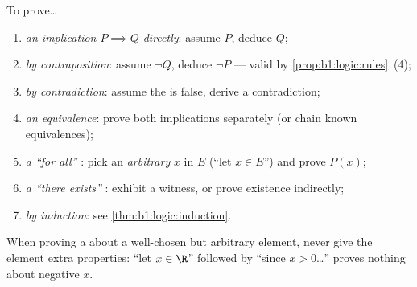 \begin{method}\label{met:b1:logic:proofs}
To prove\dots
\begin{enumerate}
  \item \emph{an implication $P \implies Q$ directly}: assume $P$,
        deduce $Q$;
  \item \emph{by contraposition}: assume $\lnot Q$, deduce $\lnot P$
        --- valid by \cref{prop:b1:logic:rules}~(4);
  \item \emph{by contradiction}: assume the  is false, derive
        a contradiction;
  \item \emph{an equivalence}: prove both implications separately (or
        chain known equivalences);
  \item \emph{a ``for all'' }: pick an \emph{arbitrary} $x$
        in $E$ (``let $x \in E$'') and prove $P(x)$;
  \item \emph{a ``there exists'' }: exhibit a witness, or
        prove existence indirectly;
  \item \emph{by induction}: see \cref{thm:b1:logic:induction}.
\end{enumerate}
When proving a  about a well-chosen but arbitrary element,
never give the element extra properties: ``let $x \in \R$'' followed by
``since $x > 0$\dots'' proves nothing about negative $x$.
\end{method}

